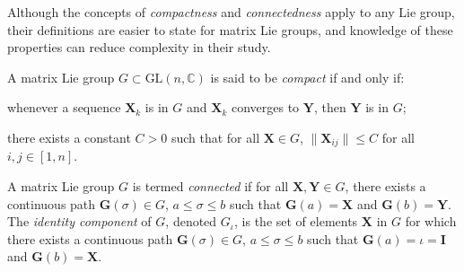 Although the concepts of \emph{compactness} and \emph{connectedness} apply to any Lie group, their definitions are easier to state for matrix Lie groups, and knowledge of these properties can reduce complexity in their study.
\begin{definition}
    A matrix Lie group $G\subset\text{GL}(n,\mathbb{C})$ is said to be \emph{compact} if and only if:
    \begin{property}
        \item whenever a sequence $\mathbf{X}_k$ is in $G$ and $\mathbf{X}_k$ converges to $\mathbf{Y}$, then $\mathbf{Y}$ is in $G$;
        \item there exists a constant $C>0$ such that for all $\mathbf{X}\in G$, $\|\mathbf{X}_{ij}\|\leq C$ for all $i,j\in[1,n]$.
    \end{property}
\end{definition}
\begin{definition}
    A matrix Lie group $G$ is termed \emph{connected} if for all $\mathbf{X},\mathbf{Y}\in G$, there exists a continuous path $\mathbf{G}(\sigma)\in G$, $a\le\sigma\le b$ such that $\mathbf{G}(a) = \mathbf{X}$ and $\mathbf{G}(b) = \mathbf{Y}$. The \emph{identity component} of $G$, denoted $G_\iota$, is the set of elements $\mathbf{X}$ in  $G$ for which there exists a continuous path $\mathbf{G}(\sigma)\in G$, $a\le\sigma\le b$ such that $\mathbf{G}(a) = \iota=\mathbf{I}$ and $\mathbf{G}(b) = \mathbf{X}$.
\end{definition}

